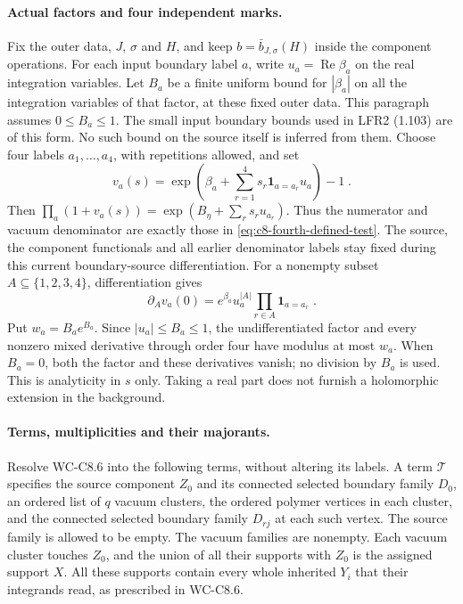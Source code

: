 \documentclass[11pt]{article}
\begin{document}
\paragraph{Actual factors and four independent marks.}
Fix the outer data, $J$, $\sigma$ and $H$, and keep
$b=\bar b_{J,\sigma}(H)$ inside the component operations. For each
input boundary label $a$, write $u_a=\operatorname{Re}\beta_a$ on
the real integration variables. Let $B_a$ be a finite uniform bound
for $|\beta_a|$ on all the integration variables of that factor,
at these fixed outer data. This paragraph assumes $0\leq B_a\leq1$.
The small input boundary bounds used in LFR2 (1.103) are of this
form. No such bound on the source itself is inferred from them.
Choose four labels $a_1,\ldots,a_4$, with repetitions allowed, and set
\begin{equation}\label{eq:c8-fourth-marked-edge}
    v_a(s)=\exp\left(\beta_a+
        \sum_{r=1}^{4}s_r\mathbf 1_{a=a_r}u_a\right)-1\;.
\end{equation}
Then $\prod_a(1+v_a(s))=\exp(B_\eta+\sum_rs_ru_{a_r})$.
Thus the numerator and vacuum denominator are exactly those in
\eqref{eq:c8-fourth-defined-test}. The source, the component
functionals and all earlier denominator labels stay fixed during
this current boundary-source differentiation. For a nonempty subset
$A\subseteq\{1,2,3,4\}$, differentiation gives
\begin{equation}\label{eq:c8-fourth-edge-derivative}
    \partial_Av_a(0)=e^{\beta_a}u_a^{|A|}
        \prod_{r\in A}\mathbf 1_{a=a_r}\;.
\end{equation}
Put $w_a=B_ae^{B_a}$. Since $|u_a|\leq B_a\leq1$, the
undifferentiated factor and every nonzero mixed derivative through
order four have modulus at most $w_a$. When $B_a=0$, both the factor
and these derivatives vanish; no division by $B_a$ is used. This is
analyticity in $s$ only. Taking a real part does not furnish a
holomorphic extension in the background.

\paragraph{Terms, multiplicities and their majorants.}
Resolve WC-C8.6 into the following terms, without altering its labels.
A term $\mathcal T$ specifies the source component $Z_0$ and its
connected selected boundary family $D_0$, an ordered list of $q$
vacuum clusters, the ordered polymer vertices in each cluster, and
the connected selected boundary family $D_{rj}$ at each such vertex.
The source family is allowed to be empty. The vacuum families are
nonempty. Each vacuum cluster touches $Z_0$, and the union of all
their supports with $Z_0$ is the assigned support $X$.
All these supports contain every whole inherited $Y_i$ that their
integrands read, as prescribed in WC-C8.6.
\end{document}
